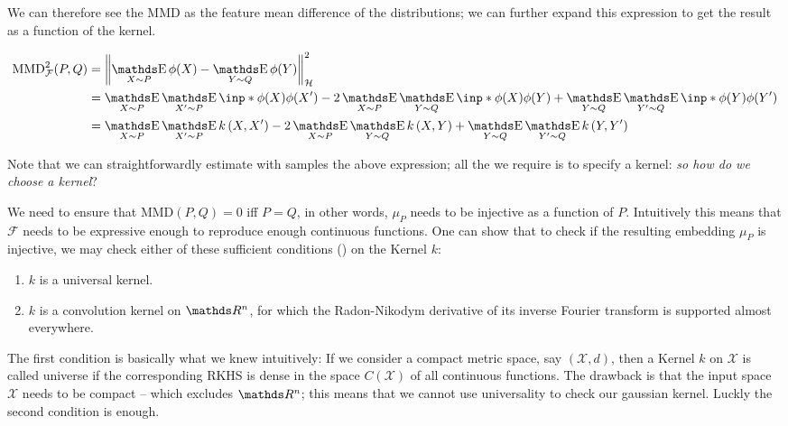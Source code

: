 We can therefore see the MMD as the feature mean difference of the distributions; we can further
expand this expression to get the result as a function of the kernel.

\begin{align*}
    \text{MMD}_\mathcal{F}^2 (P, Q)
    &=
    \norm{\mathop{\E}_{X \sim P} \phi(X)  - \mathop{\E}_{Y \sim Q} \phi(Y) }_\mathcal{H}^2 \\
    &= \mathop{\E}_{X \sim P} \mathop{\E}_{X^\prime \sim P} \inp*{\phi(X)}{\phi(X^\prime)} - 
    2 \mathop{\E}_{X \sim P} \mathop{\E}_{Y \sim Q} \inp*{\phi(X)}{\phi(Y)} +
    \mathop{\E}_{Y \sim Q} \mathop{\E}_{Y^\prime \sim Q} \inp*{\phi(Y)}{\phi(Y^\prime)} \\
    &= \mathop{\E}_{X \sim P} \mathop{\E}_{X^\prime \sim P} k \left( X, X^\prime \right) - 
    2 \mathop{\E}_{X \sim P} \mathop{\E}_{Y \sim Q} k \left( X, Y \right) +
    \mathop{\E}_{Y \sim Q} \mathop{\E}_{Y^\prime \sim Q} k \left( Y, Y^\prime \right)
\end{align*}

Note that we can straightforwardly estimate with samples the above expression; all the we require is 
to specify a kernel: \textit{so how do we choose a kernel}?

We need to ensure that $\text{MMD}(P, Q) = 0$ iff $P = Q$, in other words, $\mu_P$ needs to be injective
as a function of $P$. Intuitively this means that $\mathcal{F}$ needs to be expressive enough to 
reproduce enough continuous functions. One can show that to check if the resulting embedding 
$\mu_P$ is injective, we may check either of these sufficient conditions (\cite{sriperumbudur2008injective}) 
on the Kernel $k$:

\begin{enumerate}
    \item $k$ is a universal kernel.
    \item $k$ is a convolution kernel on $\R^n$, for which the Radon-Nikodym derivative of 
    its inverse Fourier transform is supported almost everywhere.
\end{enumerate}

The first condition is basically what we knew intuitively: 
If we consider a compact metric space, say $(\mathcal{X}, d)$, then a Kernel $k$ on $\mathcal{X}$
is called universe if the corresponding RKHS is dense 
in the space $C(\mathcal{X})$ of all continuous functions. The drawback is that the input space $\mathcal{X}$ needs to be compact -- which excludes $\R^n$; 
this means that we cannot use universality to check our gaussian kernel. Luckly the second condition
is enough.

